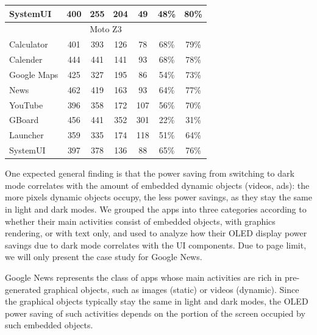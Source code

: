 \begin{table}[tp]
{\begin{tabular}{| l | c | c | c | c |c|c|}
	 SystemUI       &  400 &  255 &  204 &   49 &   48\% &   80\%  \\
	 \hline
         \multicolumn{7}{|c|}{Moto Z3} \\
	 \hline
	 Calculator	&  401 &  393 &  126 &   78 &   68\% &   79\% \\
	 Calender	&  444 &  441 &  141 &   93 &   68\% &   78\% \\
	 Google Maps	&  425 &  327 &  195 &   86 &   54\% &   73\% \\
	 News		&  462 &  419 &  163 &   93 &   64\% &   77\% \\
	 YouTube	&  396 &  358 &  172 &  107 &   56\% &   70\% \\
	 GBoard		&  456 &  441 &  352 &  301 &   22\% &   31\% \\
	 Launcher       &  359 &  335 &  174 &  118 &   51\% &   64\% \\
	 SystemUI       &  397 &  378 &  136 &   88 &   65\% &   76\% \\
	 \hline
\end{tabular}
}
\label{tab:Dark_vs_light_popular_google_apps}
\end{table}
\fi

%
One expected general finding is that
the power saving from switching to dark mode
correlates with the amount of embedded dynamic objects (\eg videos, ads):
the more pixels dynamic objects occupy, the less power savings, as they stay the same
in light and dark modes.
We grouped the apps  into three categories according to
whether their main activities consist of embedded objects, with graphics rendering, or
with text only, and used \name to analyze how 
their OLED display power savings due to dark mode correlates
with the UI components.
\fi
Due to page limit, we will only present the case study for Google News.

Google News
represents the class of apps whose main
activities are rich in pre-generated graphical objects, such as images
(static) or videos (dynamic). Since the graphical objects typically
stay the same in light and dark modes, the OLED power saving of
such activities depends on the portion of the screen occupied by such
embedded objects.

